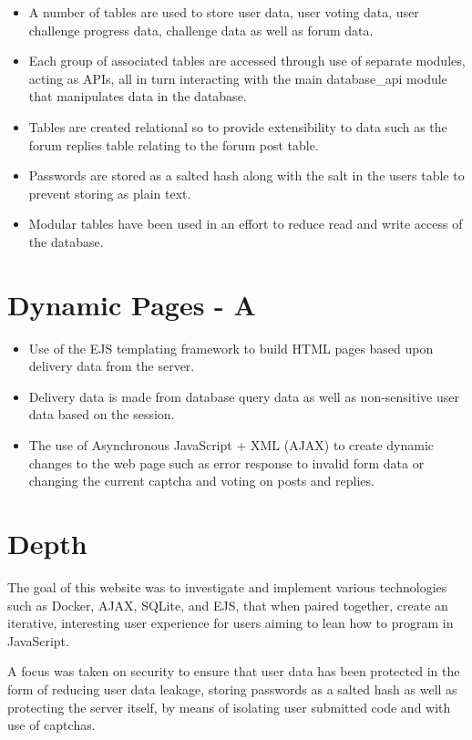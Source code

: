 \documentclass[a4paper]{article}
\begin{document}
\begin{itemize}
  \item{A number of tables are used to store user data, user voting data,
      user challenge progress data, challenge data as well as forum data.}
  \item{Each group of associated tables are accessed through use of separate
    modules, acting as APIs, all in turn interacting with the main database\_api
    module that manipulates data in the database.}
  \item{Tables are created relational so to provide extensibility to data such
    as the forum replies table relating to the forum post table.}
  \item{Passwords are stored as a salted hash along with the salt in the users
    table to prevent storing as plain text.}
  \item{Modular tables have been used in an effort to reduce read and write
    access of the database.}
\end{itemize}

\section{Dynamic Pages - A}
\begin{itemize}
  \item{Use of the EJS templating framework to build HTML pages based upon
    delivery data from the server.}
  \item{Delivery data is made from database query data as well as non-sensitive
    user data based on the session.}
  \item{The use of Asynchronous JavaScript + XML (AJAX) to create dynamic
    changes to the web page such as error response to invalid form data or
    changing the current captcha and voting on posts and replies.}
\end{itemize}

\section{Depth}
The goal of this website was to investigate and implement various technologies
such as Docker, AJAX, SQLite, and EJS, that when paired together, create an
iterative, interesting user experience for users aiming to lean how to program
in JavaScript.

A focus was taken on security to ensure that user data has been protected in the
form of reducing user data leakage, storing passwords as a salted hash as well
as protecting the server itself, by means of isolating user submitted code and
with use of captchas.
\end{document}
